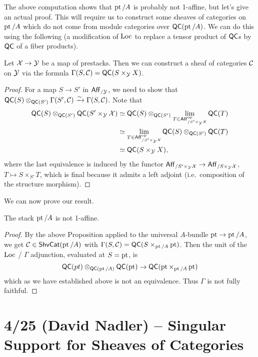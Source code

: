\documentclass{article}
\begin{document}
The above computation shows that $\operatorname{pt} / A$ is probably not 1-affine, but let's give an actual proof.
This will require us to construct some sheaves of categories on $\operatorname{pt} / A$ which do not come from module categories over $\mathsf{QC}(\operatorname{pt} / A)$.
We can do this using the following (a modification of $\operatorname{Loc}$ to replace a tensor product of $\mathsf{QC}$s by $\mathsf{QC}$ of a fiber products).

\begin{prop}
	Let $\mathcal{X} \to \mathcal{Y}$ be a map of prestacks.
	Then we can construct a sheaf of categories $\mathcal{C}$ on $\mathcal{Y}$ via the formula $\Gamma(S, \mathcal{C}) = \mathsf{QC}(S \times_{\mathcal{Y}} X)$.
\end{prop}

\begin{proof}
	For a map $S \to S'$ in $\mathsf{Aff}_{/\mathcal{Y}}$, we need to show that $\mathsf{QC}(S) \otimes_{\mathsf{QC}(S')} \Gamma(S', \mathcal{C}) \xrightarrow{\sim} \Gamma(S, \mathcal{C})$.
	Note that
	\begin{align*}
		\mathsf{QC}(S) \otimes_{\mathsf{QC}(S')} \mathsf{QC}(S' \times_{\mathcal{Y}} \mathcal{X}) &\simeq \mathsf{QC}(S) \otimes_{\mathsf{QC}(S')} \lim_{T \in \mathsf{Aff}_{/S' \times_{\mathcal{Y}} \mathcal{X}}^{\mathrm{op}}} \mathsf{QC}(T) \\
		&\simeq \lim_{T \in \mathsf{Aff}_{/S' \times_{\mathcal{Y}} \mathcal{X}}^{\mathrm{op}}} \mathsf{QC}(S) \otimes_{\mathsf{QC}(S')} \mathsf{QC}(T) \\
		&\simeq \mathsf{QC}(S \times_{\mathcal{Y}} X),
	\end{align*}
	where the last equivalence is induced by the functor $\mathsf{Aff}_{/ S' \times_{\mathcal{Y}} \mathcal{X}} \to \mathsf{Aff}_{/ S \times_{\mathcal{Y}} \mathcal{X}}$, $T \mapsto S \times_{S'} T$, which is final because it admits a left adjoint (i.e.\ composition of the structure morphism).
\end{proof}

We can now prove our result.

\begin{thm}
	The stack $\operatorname{pt} / A$ is not 1-affine.
\end{thm}

\begin{proof}
	By the above Proposition applied to the universal $A$-bundle $\operatorname{pt} \to \operatorname{pt} / A$, we get $\mathcal{C} \in \mathsf{ShvCat}(\operatorname{pt} / A)$ with $\Gamma(S, \mathcal{C}) = \mathsf{QC}(S \times_{\operatorname{pt} / A} \operatorname{pt})$.
	Then the unit of the $\operatorname{Loc}$ / $\Gamma$ adjunction, evaluated at $S = \operatorname{pt}$, is
	\[
		\mathsf{QC}(pt) \otimes_{\mathsf{QC}(\operatorname{pt} / A)} \mathsf{QC}(\operatorname{pt}) \to \mathsf{QC}(\operatorname{pt} \times_{\operatorname{pt} / A} \operatorname{pt})
	\]
	which as we have established above is not an equivalence.
	Thus $\Gamma$ is not fully faithful.
\end{proof}

\section{4/25 (David Nadler) -- Singular Support for Sheaves of Categories}
\end{document}
